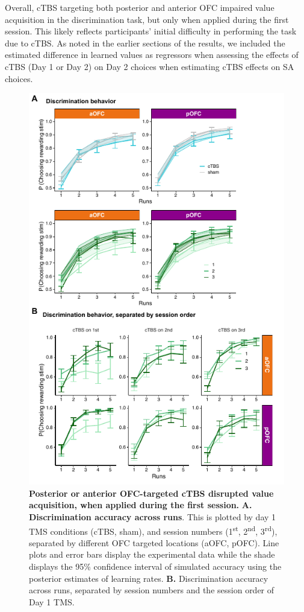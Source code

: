 \documentclass[lineno,sn-basic]{sn-jnl}%
\begin{document}
Overall, cTBS targeting both posterior and anterior OFC impaired value acquisition in the discrimination task, but only when applied during the first session. This likely reflects participants' initial difficulty in performing the task due to cTBS. As noted in the earlier sections of the results, we included the estimated difference in learned values as regressors when assessing the effects of cTBS (Day 1 or Day 2) on Day 2 choices when estimating cTBS effects on SA choices. 

\begin{figure}
\centering
\includegraphics[width=0.7\linewidth]{fig_disc.pdf}
\caption{\textbf{Posterior or anterior OFC-targeted cTBS disrupted value acquisition, when applied during the first session.} \textbf{A. Discrimination accuracy across runs}. This is plotted by day 1 TMS conditions (cTBS, sham), and session numbers (1\textsuperscript{st}, 2\textsuperscript{nd}, 3\textsuperscript{rd}), separated by different OFC targeted locations (aOFC, pOFC). Line plots and error bars display the experimental data while the shade displays the 95\% confidence interval of simulated accuracy using the posterior estimates of learning rates. 
\textbf{B.} Discrimination accuracy across runs, separated by session numbers and the session order of Day 1 TMS.}
\label{fig_disc}
\end{figure}
\end{document}
